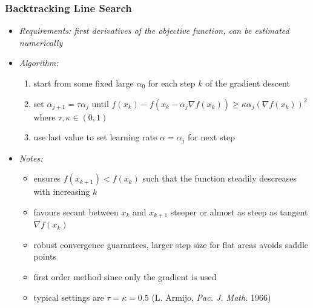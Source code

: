 	\begin{frame}
		\frametitle{Backtracking Line Search}
		\begin{itemize}
			\item<2-> \itshape{Requirements:} first derivatives of the objective function, can be estimated numerically
			\item<3-> \itshape{Algorithm:}
				\begin{enumerate}
					\item<4-> start from some fixed large $\alpha_0$ for each step $k$ of the gradient descent
					\item<5-> set $\alpha_{j+1} = \tau\alpha_j$ until $f\left(x_k\right) - f\left(x_k - \alpha_j\nabla f(x_k)\right)
							  \geq \kappa\alpha_j\left(\nabla f(x_k)\right)^2$ where $\tau, \kappa \in (0,1)$
					\item<6-> use last value to set learning rate $\alpha = \alpha_j$ for next step
				\end{enumerate}
			\item<7-> \itshape{Notes:}
				\begin{itemize}
					\item<8-> ensures $f(x_{k+1}) < f(x_k)$ such that the function steadily descreases with increasing $k$
					\item<9-> favours secant between $x_k$ and $x_{k+1}$ steeper or almost as steep as tangent $\nabla f(x_k)$
					\item<10-> robust convergence guarantees, larger step size for flat areas avoids saddle points
					\item<11-> first order method since only the gradient is used
					\item<12-> typical settings are $\tau = \kappa = 0.5$ (L. Armijo, {\itshape{Pac. J. Math.}} 1966)
				\end{itemize}
		\end{itemize}
	\end{frame}

